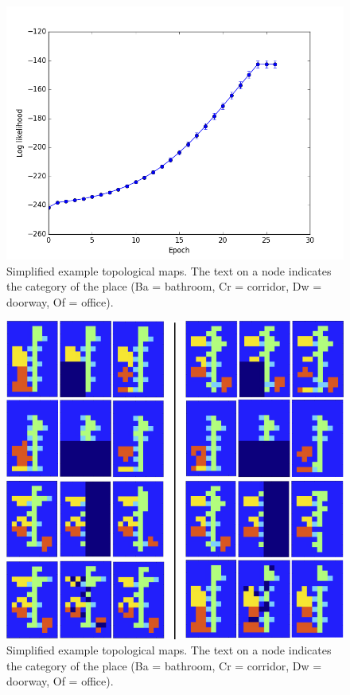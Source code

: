\documentclass[10pt, titlepage]{article}
\theoremstyle{definition}
\begin{document}
\begin{figure}[!htb]
    \centering
    \captionsetup{width=.8\linewidth}
    \includegraphics[scale=0.7]{images/likelihood.png}
    \caption{Simplified example topological maps. The text on a node indicates the category of the place (Ba = bathroom, Cr = corridor, Dw = doorway, Of = office).}
    \label{fig:topomap}
\end{figure}


\begin{figure}[!htb]
    \centering
    \captionsetup{width=.8\linewidth}
    \includegraphics[scale=0.7]{images/placegrid_completion.png}
    \caption{Simplified example topological maps. The text on a node indicates the category of the place (Ba = bathroom, Cr = corridor, Dw = doorway, Of = office).}
    \label{fig:topomap}
\end{figure}
\end{document}
